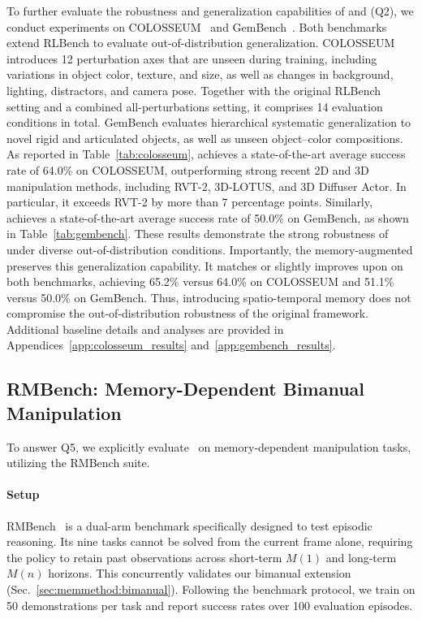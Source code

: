 To further evaluate the robustness and generalization capabilities of
\method and \memmethod (Q2), we conduct experiments on
COLOSSEUM~\cite{pumacay2024colosseum} and
GemBench~\cite{garcia2024towards}.
Both benchmarks extend RLBench to evaluate out-of-distribution
generalization.
COLOSSEUM introduces 12 perturbation axes that are unseen during training,
including variations in object color, texture, and size, as well as changes
in background, lighting, distractors, and camera pose.
Together with the original RLBench setting and a combined
all-perturbations setting, it comprises 14 evaluation conditions in total.
GemBench evaluates hierarchical systematic generalization to novel rigid and
articulated objects, as well as unseen object--color compositions.
As reported in Table~\ref{tab:colosseum}, \method achieves a
state-of-the-art average success rate of 64.0\% on COLOSSEUM, outperforming
strong recent 2D and 3D manipulation methods, including RVT-2, 3D-LOTUS,
and 3D Diffuser Actor.
In particular, it exceeds RVT-2 by more than 7 percentage points.
Similarly, \method achieves a state-of-the-art average success rate of
50.0\% on GemBench, as shown in Table~\ref{tab:gembench}.
These results demonstrate the strong robustness of \method under diverse
out-of-distribution conditions.
Importantly, the memory-augmented \memmethod preserves this generalization
capability.
It matches or slightly improves upon \method on both benchmarks, achieving
65.2\% versus 64.0\% on COLOSSEUM and 51.1\% versus 50.0\% on GemBench.
Thus, introducing spatio-temporal memory does not compromise the
out-of-distribution robustness of the original framework.
Additional baseline details and analyses are provided in
Appendices~\ref{app:colosseum_results} and~\ref{app:gembench_results}.

\subsection{RMBench: Memory-Dependent Bimanual Manipulation}
\label{sec:exp:bridgevla_plus}
\label{sec:exp:rmbench}

To answer Q5, we explicitly evaluate \memmethod\ on memory-dependent manipulation tasks, utilizing the RMBench suite.

\paragraph{Setup}
RMBench~\cite{chen2026rmbench} is a dual-arm benchmark specifically designed to test episodic reasoning. Its nine tasks cannot be solved from the current frame alone, requiring the policy to retain past observations across short-term $M(1)$ and long-term $M(n)$ horizons. This concurrently validates our bimanual extension (Sec.~\ref{sec:memmethod:bimanual}). Following the benchmark protocol, we train on 50 demonstrations per task and report success rates over 100 evaluation episodes.

